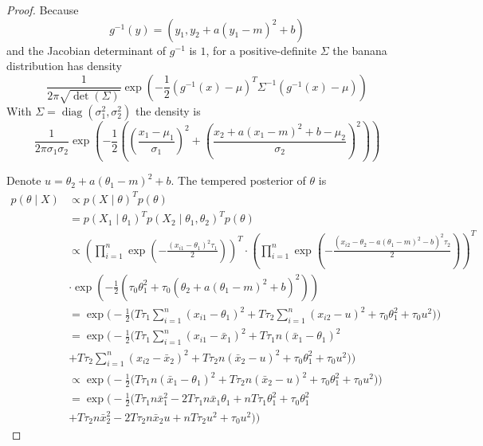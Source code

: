 \documentclass[english,twoside,openright]{HYgraduMLDS}
\DeclareMathOperator{\diag}{diag}
\begin{document}
\begin{proof}
    Because
    \[
    g^{-1}(y) = (y_1, y_2 + a(y_1 - m)^2 + b)
    \]
    and the Jacobian determinant of \(g^{-1}\) is \(1\),
    for a positive-definite \(\Sigma\) the banana distribution has
    density
    \[
    \frac{1}{2\pi\sqrt{\det(\Sigma)}}\exp
    \left(-\frac{1}{2}(g^{-1}(x) - \mu)^T\Sigma^{-1}(g^{-1}(x) - \mu)\right)
    \]
    With \(\Sigma = \diag(\sigma_1^2, \sigma_2^2)\) the density is
    \[
    \frac{1}{2\pi\sigma_1\sigma_2}\exp
    \left(-\frac{1}{2}\left(\left(\frac{x_1 - \mu_1}{\sigma_1}\right)^2
    + \left(\frac{x_2 + a(x_1 - m)^2 + b - \mu_2}{\sigma_2}\right)^2\right)\right)
    \]

    Denote \(u = \theta_2 + a(\theta_1 - m)^2 + b\).
    The tempered posterior of \(\theta\) is
    \begin{align*}
        p(\theta\mid X) &\propto p(X\mid \theta)^Tp(\theta)
        \\&= p(X_1\mid \theta_1)^Tp(X_2\mid \theta_1, \theta_2)^Tp(\theta)
        \\&\propto \left(\prod_{i=1}^n \exp
        \left(-\frac{(x_{i1} - \theta_1)^2\tau_1}{2}\right)\right)^T
        \cdot\left(\prod_{i=1}^n \exp\left(-\frac{(x_{i2} - \theta_2
        - a(\theta_1 - m)^2 - b)^2\tau_2}{2}\right)\right)^T
        \\&\cdot \exp\left(-\frac{1}{2}\left(\tau_0\theta_1^2
        + \tau_0(\theta_2 + a(\theta_1 - m)^2 + b)^2\right)\right)
        \\&=\exp\Bigg(-\frac{1}{2}\Big(T\tau_1\sum_{i=1}^n
        (x_{i1} - \theta_1)^2
        + T\tau_2\sum_{i=1}^n(x_{i2} - u)^2
        + \tau_0\theta_1^2 + \tau_0 u^2\Big)\Bigg)
        \\&=\exp\Bigg(-\frac{1}{2}\Big(T\tau_1\sum_{i=1}^n
        (x_{i1} - \bar{x}_1)^2 + T\tau_1n(\bar{x}_1 - \theta_1)^2
        \\&+ T\tau_2\sum_{i=1}^n (x_{i2}  - \bar{x}_2)^2 + T\tau_2n(\bar{x}_2 - u)^2
        + \tau_0\theta_1^2 + \tau_0 u^2\Big)\Bigg)
        \\&\propto\exp\Bigg(-\frac{1}{2}\Big(T\tau_1n(\bar{x}_1 - \theta_1)^2
        + T\tau_2n(\bar{x}_2 - u)^2
        + \tau_0\theta_1^2 + \tau_0 u^2\Big)\Bigg)
        \\&=\exp\Bigg(-\frac{1}{2}\Big(T\tau_1n\bar{x}_1^2
        - 2T\tau_1n\bar{x}_1\theta_1 + nT\tau_1\theta_1^2 + \tau_0\theta_1^2
        \\&+ T\tau_2n\bar{x}_2^2 - 2T\tau_2n\bar{x}_2u + nT\tau_2u^2
        + \tau_0 u^2\Big)\Bigg)

\end{align*}
\end{proof}
\end{document}
